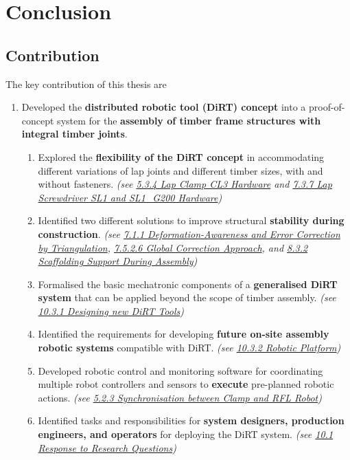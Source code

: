 \chapter{Conclusion}

\section{Contribution}

The key contribution of this thesis are

\begin{enumerate}
	\item Developed the \textbf{distributed robotic tool (DiRT) concept} into a proof-of-concept system for the \textbf{assembly of timber frame structures with integral timber joints}. 

\begin{enumerate}
	\item Explored the \textbf{flexibility of the DiRT concept} in accommodating different variations of lap joints and different timber sizes, with and without fasteners. \textit{(see \uline{5.3.4 Lap Clamp CL3 Hardware} and \uline{7.3.7 Lap Screwdriver SL1 and SL1\_G200 Hardware})}

	\item Identified two different solutions to improve structural \textbf{stability during construction}. \textit{(see \uline{7.1.1 Deformation-Awareness and Error Correction by Triangulation}, \uline{7.5.2.6 Global Correction Approach}, and \uline{8.3.2 Scaffolding Support During Assembly})}

	\item Formalised the basic mechatronic components of a \textbf{generalised DiRT system} that can be applied beyond the scope of timber assembly. \textit{(see \uline{10.3.1 Designing new DiRT Tools})}

	\item Identified the requirements for developing \textbf{future on-site assembly robotic systems} compatible with DiRT.  \textit{(see \uline{10.3.2 Robotic Platform})}

	\item Developed robotic control and monitoring software for coordinating multiple robot controllers and sensors to \textbf{execute} pre-planned robotic actions. \textit{(see \uline{5.2.3 Synchronisation between Clamp and RFL Robot})}

	\item Identified tasks and responsibilities for\textbf{ system designers, production engineers, and operators} for deploying the DiRT system. \textit{(see \uline{10.1 Response to Research Questions})}


\end{enumerate}
\end{enumerate}
